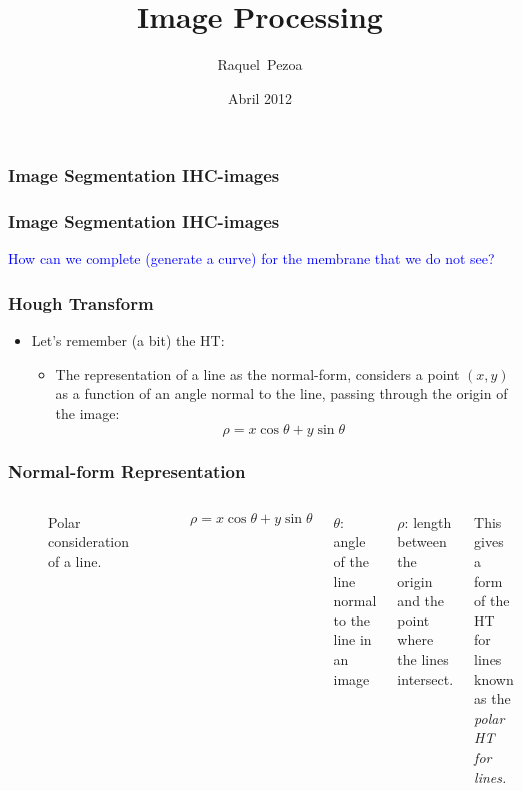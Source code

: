 \documentclass{beamer}
\title[Image Processing]{Image Processing}
\author[R. Pezoa]{%
  Raquel~Pezoa}
\institute[Universidad T\'ecnica Federico Santa Mar\'ia]{
  Departamento de Inform\'atica\\
  Universidad T\'ecnica Federico Santa Mar\'ia
}
\date[Abril 2012]{Abril 2012}
\begin{document}
  
  \frame{\titlepage}
  

\begin{frame}
  \frametitle{Image Segmentation IHC-images}

\begin{figure}
\centering
{}
\end{figure}

\end{frame}

\begin{frame}
  \frametitle{Image Segmentation IHC-images}

\begin{figure}
\centering
{}
\end{figure}
\textcolor{blue}{How can we complete (generate a curve) for the membrane that we do not see?}
\end{frame}


\begin{frame}
  \frametitle{Hough Transform}
  \begin{itemize}
  \item Let's remember (a bit) the HT:
\begin{itemize}
  \item The representation of a line as the normal-form,
   considers a point $(x,y)$ as a function of an angle normal
    to the line, passing through the origin of the image:
    \begin{equation}
      \rho = x  \cos\theta + y \sin\theta
    \end{equation}
\end{itemize}
    \end{itemize}
\end{frame}


\begin{frame}
  \frametitle{Normal-form Representation}
\begin{columns}
  \begin{figure}
    \caption{Polar consideration of a line.}
    \label{fig:polarLine}
  \end{figure}

  $$\rho = x  \cos\theta + y \sin\theta$$


$\theta$: angle of the line normal to the line in an image

$\rho$: length between the origin and the point where the lines
intersect.

This gives a form of the HT for lines known as the \emph{polar HT for
  lines.}
\end{columns}
\end{frame}
\end{document}
